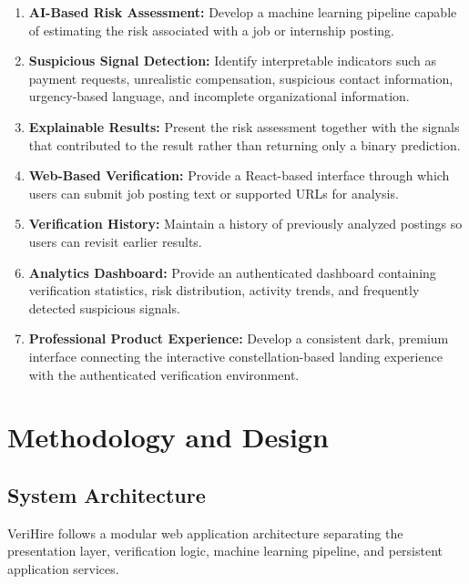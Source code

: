 \documentclass[12pt,a4paper]{report}
\begin{document}
\begin{enumerate}

    \item \textbf{AI-Based Risk Assessment:}
    Develop a machine learning pipeline capable of estimating the risk associated with a job or internship posting.

    \item \textbf{Suspicious Signal Detection:}
    Identify interpretable indicators such as payment requests, unrealistic compensation, suspicious contact information, urgency-based language, and incomplete organizational information.

    \item \textbf{Explainable Results:}
    Present the risk assessment together with the signals that contributed to the result rather than returning only a binary prediction.

    \item \textbf{Web-Based Verification:}
    Provide a React-based interface through which users can submit job posting text or supported URLs for analysis.

    \item \textbf{Verification History:}
    Maintain a history of previously analyzed postings so users can revisit earlier results.

    \item \textbf{Analytics Dashboard:}
    Provide an authenticated dashboard containing verification statistics, risk distribution, activity trends, and frequently detected suspicious signals.

    \item \textbf{Professional Product Experience:}
    Develop a consistent dark, premium interface connecting the interactive constellation-based landing experience with the authenticated verification environment.

\end{enumerate}


\chapter{Methodology and Design}

\section{System Architecture}

VeriHire follows a modular web application architecture separating the presentation layer, verification logic, machine learning pipeline, and persistent application services.
\end{document}
